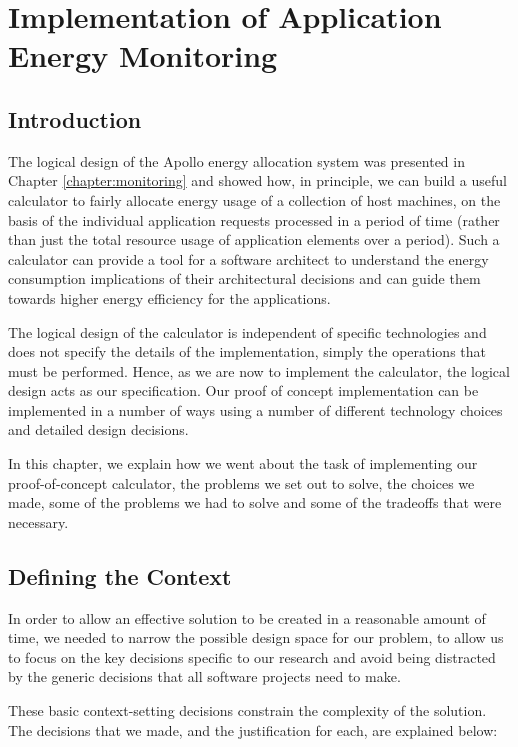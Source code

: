 \chapter{Implementation of Application Energy Monitoring}
\label{chapter:implementation}

\section{Introduction}
The logical design of the Apollo energy allocation system was presented in Chapter \ref{chapter:monitoring} and showed how, in principle, we can build a useful calculator to fairly allocate energy usage of a collection of host machines, on the basis of the individual application requests processed in a period of time (rather than just the total resource usage of application elements over a period).   Such a calculator can provide a tool for a software architect to understand the energy consumption implications of their architectural decisions and can guide them towards higher energy efficiency for the applications.

The logical design of the calculator is independent of specific technologies and does not specify the details of the implementation, simply the operations that must be performed.  Hence, as we are now to implement the calculator, the logical design acts as our specification.  Our proof of concept implementation can be implemented in a number of ways using a number of different technology choices and detailed design decisions.

In this chapter, we explain how we went about the task of implementing our proof-of-concept calculator, the problems we set out to solve, the choices we made, some of the problems we had to solve and some of the tradeoffs that were necessary.

\section{Defining the Context}
\label{section:definingcontext}

In order to allow an effective solution to be created in a reasonable amount of time, we needed to narrow the possible design space for our problem, to allow us to focus on the key decisions specific to our research and avoid being distracted by the generic decisions that all software projects need to make.

These basic context-setting decisions constrain the complexity of the solution.  The decisions that we made, and the justification for each, are explained below:

